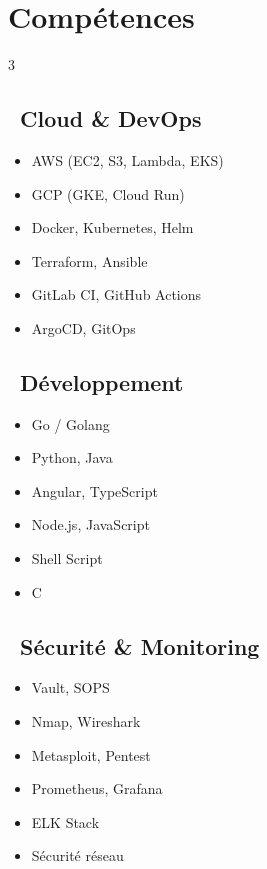\section{\icon{\faTools} Comp\'{e}tences}
\begin{multicols}{3}
  \subsection*{\small\textcolor{accent}{\faCloud\ Cloud \& DevOps}}
  \begin{itemize}
    \item AWS (EC2, S3, Lambda, EKS)
    \item GCP (GKE, Cloud Run)
    \item Docker, Kubernetes, Helm
    \item Terraform, Ansible
    \item GitLab CI, GitHub Actions
    \item ArgoCD, GitOps
  \end{itemize}
  \columnbreak
  \subsection*{\small\textcolor{accent}{\faCode\ D\'{e}veloppement}}
  \begin{itemize}
    \item Go / Golang
    \item Python, Java
    \item Angular, TypeScript
    \item Node.js, JavaScript
    \item Shell Script
    \item C
  \end{itemize}
  \columnbreak
  \subsection*{\small\textcolor{accent}{\faLock\ S\'{e}curit\'{e} \& Monitoring}}
  \begin{itemize}
    \item Vault, SOPS
    \item Nmap, Wireshark
    \item Metasploit, Pentest
    \item Prometheus, Grafana
    \item ELK Stack
    \item S\'{e}curit\'{e} r\'{e}seau
  \end{itemize}
\end{multicols}
